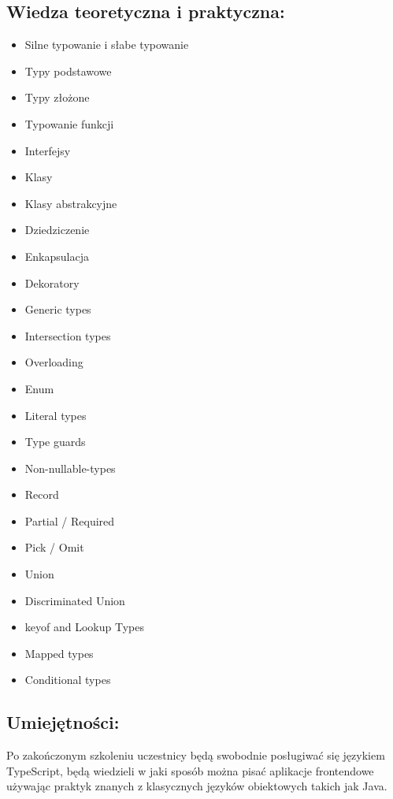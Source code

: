 \documentclass{article}[10pt]
\begin{document}
	\subsection*{Wiedza teoretyczna i praktyczna:}
\begin{adjustwidth}{1.5cm}{}
	\begin{itemize}
		\item Silne typowanie i słabe typowanie
		\item Typy podstawowe
		\item Typy złożone
		\item Typowanie funkcji
		\item Interfejsy
		\item Klasy
		\item Klasy abstrakcyjne
		\item Dziedziczenie
		\item Enkapsulacja
		\item Dekoratory
		\item Generic types
		\item Intersection types
		\item Overloading
		\item Enum
		\item Literal types
		\item Type guards
		\item Non-nullable-types
		\item Record
		\item Partial / Required
		\item Pick / Omit
		\item Union
		\item Discriminated Union
		\item keyof and Lookup Types
		\item Mapped types
		\item Conditional types
	\end{itemize}
\end{adjustwidth}

	\subsection*{Umiejętności:}
\begin{adjustwidth}{2cm}{}
\justifying
	
Po zakończonym szkoleniu uczestnicy będą swobodnie posługiwać się językiem TypeScript, będą wiedzieli w jaki sposób można pisać aplikacje frontendowe używając praktyk znanych z klasycznych języków obiektowych takich jak Java.



\end{adjustwidth}
\end{document}
